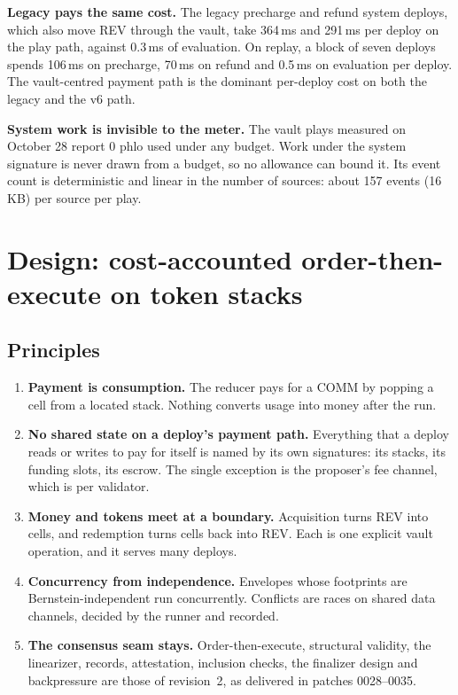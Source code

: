 \documentclass[11pt]{article}
\newcommand{\code}{\path}
\begin{document}
\textbf{Legacy \code{dev} pays the same cost.} The legacy precharge and refund system deploys, which also move REV through the vault, take 364\,ms and 291\,ms per deploy on the play path, against 0.3\,ms of evaluation. On replay, a block of seven deploys spends 106\,ms on precharge, 70\,ms on refund and 0.5\,ms on evaluation per deploy. The vault-centred payment path is the dominant per-deploy cost on both the legacy and the v6 path.

\textbf{System work is invisible to the meter.} The vault plays measured on October 28 report 0 phlo used under any budget. Work under the system signature is never drawn from a budget, so no allowance can bound it. Its event count is deterministic and linear in the number of sources: about 157 events (16\,KB) per source per play.

\section{Design: cost-accounted order-then-execute on token stacks}\label{sec:design}

\subsection{Principles}

\begin{enumerate}[label=P\arabic*.,leftmargin=2.2em]
\item \textbf{Payment is consumption.} The reducer pays for a COMM by popping a cell from a located stack. Nothing converts usage into money after the run.
\item \textbf{No shared state on a deploy's payment path.} Everything that a deploy reads or writes to pay for itself is named by its own signatures: its stacks, its funding slots, its escrow. The single exception is the proposer's fee channel, which is per validator.
\item \textbf{Money and tokens meet at a boundary.} Acquisition turns REV into cells, and redemption turns cells back into REV. Each is one explicit vault operation, and it serves many deploys.
\item \textbf{Concurrency from independence.} Envelopes whose footprints are Bernstein-independent run concurrently. Conflicts are races on shared data channels, decided by the runner and recorded.
\item \textbf{The consensus seam stays.} Order-then-execute, structural validity, the linearizer, records, attestation, inclusion checks, the finalizer design and backpressure are those of revision~2, as delivered in patches 0028--0035.
\end{enumerate}
\end{document}
